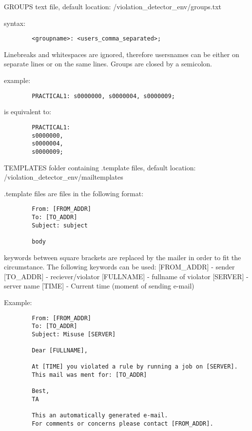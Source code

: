 \documentclass[10pt]{article}
\begin{document}
GROUPS
text file, default location: /violation\_detector\_env/groups.txt
        
syntax:
\begin{verbatim}
        <groupname>: <users_comma_separated>;
\end{verbatim}
Linebreaks and whitespaces are ignored, therefore usersnames can 
be either on separate lines or on the same lines. Groups are
closed by a semicolon.
        
example:
\begin{verbatim}
        PRACTICAL1: s0000000, s0000004, s0000009;
\end{verbatim}
is equivalent to:
\begin{verbatim}
        PRACTICAL1: 
        s0000000,
        s0000004,
        s0000009;
\end{verbatim}
        

TEMPLATES
folder containing .template files,
default location: /violation\_detector\_env/mailtemplates
        
.template files are files in the following format:
\begin{verbatim}
        From: [FROM_ADDR]
        To: [TO_ADDR]
        Subject: subject
        
        body
\end{verbatim}
        
keywords between square brackets are replaced by the mailer
in order to fit the circumstance. The following keywords can be used: 
[FROM\_ADDR]     - sender 
[TO\_ADDR]       - reciever/violator 
[FULLNAME]      - fullname of violator 
[SERVER]        - server name 
[TIME]          - Current time (moment of sending e-mail) 

Example:
\begin{verbatim}
        From: [FROM_ADDR]
        To: [TO_ADDR]
        Subject: Misuse [SERVER]

        Dear [FULLNAME],

        At [TIME] you violated a rule by running a job on [SERVER]. 
        This mail was ment for: [TO_ADDR]

        Best,
        TA
        
        This an automatically generated e-mail.
        For comments or concerns please contact [FROM_ADDR].
\end{verbatim}
\end{document}
